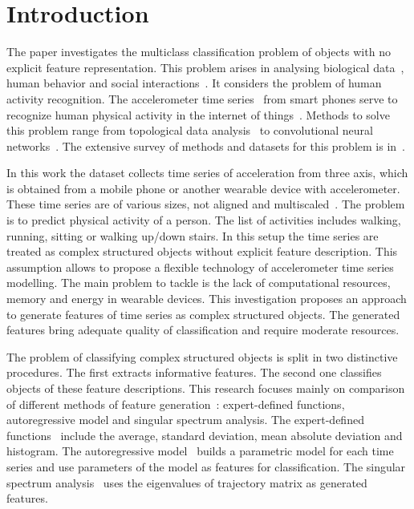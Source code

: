\section{Introduction}
The paper investigates the multiclass classification problem of objects with no explicit feature representation. This problem arises in analysing biological data~\cite{motrenko2016extracting}, human behavior and social interactions~\cite{bao2004activity}. It considers the problem of human activity recognition.
The accelerometer time series~\cite{ignatov2016human,lu2016towards,wang2014human} from smart phones serve to recognize human physical activity in the internet of things~\cite{budnik2017learned,lu2016activity}.
Methods to solve this problem range from topological data analysis~\cite{umeda2017time} to convolutional neural networks~\cite{hammerla2016deep}. 
The extensive survey of methods and datasets for this problem is in~\cite{incel2013review}. 

In this work the dataset collects time series of acceleration from three axis, which is obtained from a mobile phone or another wearable device with accelerometer. 
These time series are of various sizes, not aligned and multiscaled~\cite{geurts2001pattern}.
The problem is to predict physical activity of a person. 
The list of activities includes walking, running, sitting or walking up/down stairs.
In this setup the time series are treated as complex structured objects without explicit feature description. 
This assumption allows to propose a flexible technology of accelerometer time series modelling. 
The main problem to tackle is the lack of computational resources, memory and energy in wearable devices. 
This investigation proposes an approach to generate features of time series as complex structured objects. 
The generated features bring adequate quality of classification and require moderate resources.

The problem of classifying complex structured objects is split in two distinctive procedures. 
The first extracts informative features. The second one classifies objects of these feature descriptions.
This research focuses mainly on comparison of different methods of feature generation~\cite{karasikov2016feature,ivkin2015ts}: expert-defined functions, autoregressive model and singular spectrum analysis.
The expert-defined functions~\cite{kwapisz2011activity} include the average, standard deviation, mean absolute deviation and histogram. The autoregressive model~\cite{lukashin2003adaptive} builds a parametric model for each time series and use parameters of the model as features for classification. The singular spectrum analysis~\cite{hassani2007singular} uses the eigenvalues of trajectory matrix as generated features.

